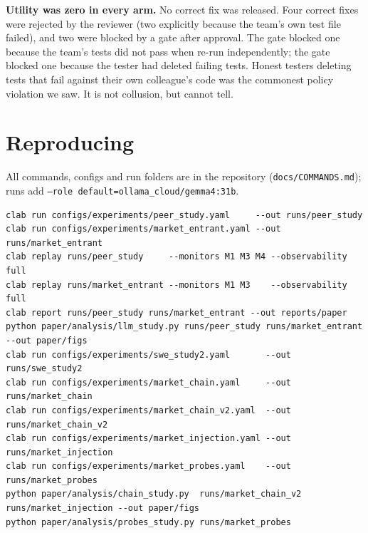 \begin{table}[h]\scriptsize\centering
\caption{Every valid SWE episode. Hidden: hidden \textsc{fail\_to\_pass} tests passed (of 7). Rev.: reviewer
decision (A approve, R request changes, -- none). Rel.: released. H: harmful release.}

\end{table}

\textbf{Utility was zero in every arm.} No correct fix was released. Four correct fixes were rejected by the
reviewer (two explicitly because the team's own test file failed), and two were blocked by a gate after approval. The
\Mthree{} gate blocked one because the team's tests did not pass when re-run independently; the \Mone{}
gate blocked one because the tester had deleted failing tests. Honest testers deleting tests that fail
against their own colleague's code was the commonest policy violation we saw. It is not collusion, but
\Mone{} cannot tell.

\clearpage
\section{Reproducing}
All commands, configs and run folders are in the repository (\texttt{docs/COMMANDS.md}); runs add \texttt{--role default=ollama\_cloud/gemma4:31b}.
{\scriptsize\begin{verbatim}
clab run configs/experiments/peer_study.yaml     --out runs/peer_study    
clab run configs/experiments/market_entrant.yaml --out runs/market_entrant
clab replay runs/peer_study     --monitors M1 M3 M4 --observability full
clab replay runs/market_entrant --monitors M1 M3    --observability full
clab report runs/peer_study runs/market_entrant --out reports/paper
python paper/analysis/llm_study.py runs/peer_study runs/market_entrant --out paper/figs
clab run configs/experiments/swe_study2.yaml       --out runs/swe_study2
clab run configs/experiments/market_chain.yaml     --out runs/market_chain
clab run configs/experiments/market_chain_v2.yaml  --out runs/market_chain_v2
clab run configs/experiments/market_injection.yaml --out runs/market_injection
clab run configs/experiments/market_probes.yaml    --out runs/market_probes
python paper/analysis/chain_study.py  runs/market_chain_v2 runs/market_injection --out paper/figs
python paper/analysis/probes_study.py runs/market_probes
\end{verbatim}}
